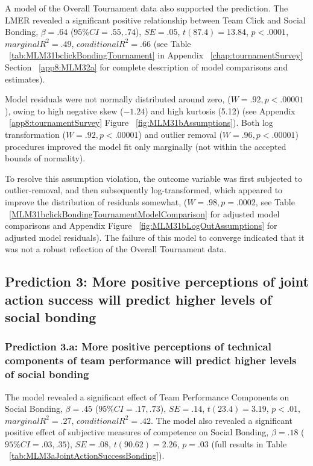 \begin{CJK}{UTF8}{gbsn}
A model of the Overall Tournament data also supported the prediction. The LMER revealed a significant positive relationship between  Team Click and Social Bonding, $\beta = .64$ ($95\% CI = .55, .74$), $SE = .05$, $t(87.4) = 13.84$, $p < .0001$, $marginal R^2 = .49$, $conditional R^2 = .66$ (see Table ~\ref{tab:MLM31bclickBondingTournament} in Appendix ~\ref{chap:tournamentSurvey} Section ~\ref{app8:MLM32a} for complete description of model comparisons and estimates).

Model residuals were not normally distributed around zero, ($W = .92, p < .00001$), owing to high negative skew ($-1.24$) and high kurtosis (5.12) (see Appendix ~\ref{app8:tournamentSurvey} Figure ~\ref{fig:MLM31bAssumptions}). Both log transformation ($W = .92, p < .00001$) and outlier removal ($W = .96, p < .00001$) procedures improved the model fit only marginally (not within the accepted bounds of normality).

To resolve this assumption violation, the outcome variable was first subjected to outlier-removal, and then subsequently log-transformed, which appeared to improve the distribution of residuals somewhat, ($W = .98, p = .0002$, see Table ~\ref{MLM31bclickBondingTournamentModelComparison} for adjusted model comparisons and Appendix Figure ~\ref{fig:MLM31bLogOutAssumptions} for adjusted model residuals).  The failure of this model to converge indicated that it was not a robust reflection of the Overall Tournament data.











\subsection{Prediction 3: More positive perceptions of joint action success will predict higher levels of social bonding}



\subsubsection{Prediction 3.a: More positive perceptions of technical components of team performance will predict higher levels of social bonding }


The model revealed a significant effect of Team Performance Components on Social Bonding, $\beta = .45$ ($95\% CI =  .17, .73$), $SE = .14$, $t(23.4) = 3.19$, $p < .01$, $marginal R^2 = .27$, $conditional R^2 = .42$.  The model also revealed a significant positive effect of subjective measures of competence on Social Bonding, $\beta = .18$ ($95\% CI =  .03, .35$), $SE = .08$, $t(90.62) = 2.26$, $p = .03$ (full results in Table ~\ref{tab:MLM3aJointActionSuccessBonding}).


\end{CJK}
